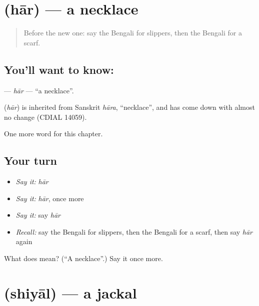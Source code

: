 \section[\texorpdfstring{\bn{হার} (hār)}{হার (hār)}]{ (hār) — a necklace}

\label{lesson:BN-C120-har}



\begin{quote}
Before the new one: say the Bengali for slippers, then the Bengali for a scarf.
\end{quote}

\subsection*{You'll want to know: }
\textbf{} — \emph{hār} — \textquotedblleft{}a necklace\textquotedblright{}.

\begin{cousinweb}
\textbf{} (\emph{hār}) is inherited from Sanskrit \emph{hāra}, \textquotedblleft{}necklace\textquotedblright{}, and has come down with almost no change (CDIAL 14059).
\end{cousinweb}

\begin{grammarlens}[title={What you've built}]
One more word for this chapter.
\end{grammarlens}

\subsection*{Your turn}
\begin{itemize}
\raggedright
  \item \emph{Say it:} \emph{hār}
  \item \emph{Say it:} \emph{hār}, once more
  \item \emph{Say it:} say \emph{hār}
  \item \emph{Recall:} say the Bengali for slippers, then the Bengali for a scarf, then say \emph{hār} again
\end{itemize}

\begin{tcolorbox}[breakable,colback=teal!4,colframe=teal!35!black,title={Before you move on}]
What does  mean? (\textquotedblleft{}A necklace\textquotedblright{}.) Say it once more.
\end{tcolorbox}
\section[\texorpdfstring{\bn{শিয়াল} (shiyāl)}{শিয়াল (shiyāl)}]{ (shiyāl) — a jackal}

